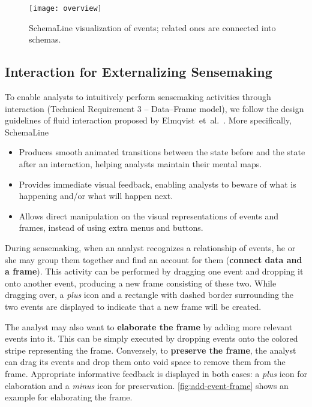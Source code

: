 \begin{figure}[!htb]
	\centering
	\texttt{[image: overview]}
	\caption[SchemaLine visualization of events]{SchemaLine visualization of events; related ones are connected into schemas.}
	\label{fig:sl-overview}
\end{figure}

\subsection{Interaction for Externalizing Sensemaking}
To enable analysts to intuitively perform sensemaking activities through interaction (Technical Requirement 3 -- Data--Frame model), we follow the design guidelines of fluid interaction proposed by Elmqvist~et~al.~\cite{Elmqvist2011}. More specifically, SchemaLine 
\begin{itemize}
	\item Produces smooth animated transitions between the state before and the state after an interaction, helping analysts maintain their mental maps.
	\item Provides immediate visual feedback, enabling analysts to beware of what is happening and/or what will happen next.
	\item Allows direct manipulation on the visual representations of events and frames, instead of using extra menus and buttons.
\end{itemize}

During sensemaking, when an analyst recognizes a relationship of events, he or she may group them together and find an account for them (\textbf{connect data and a frame}). This activity can be performed by dragging one event and dropping it onto another event, producing a new frame consisting of these two. While dragging over, a \emph{plus} icon and a rectangle with dashed border surrounding the two events are displayed to indicate that a new frame will be created. 

The analyst may also want to \textbf{elaborate the frame} by adding more relevant events into it. This can be simply executed by dropping events onto the colored stripe representing the frame. Conversely, to \textbf{preserve the frame}, the analyst can drag its events and drop them onto void space to remove them from the frame. Appropriate informative feedback is displayed in both cases: a \emph{plus} icon for elaboration and a \emph{minus} icon for preservation. \autoref{fig:add-event-frame} shows an example for elaborating the frame.


